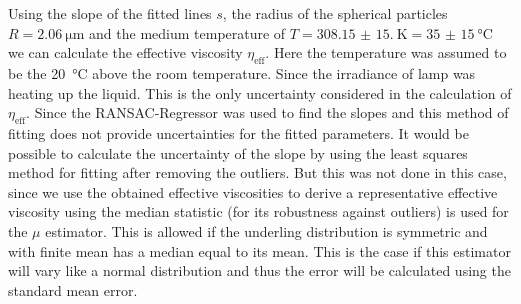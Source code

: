 \documentclass[12pt,english,ngerman]{scrartcl}
\begin{document}
Using the slope of the fitted lines $s$, the radius of the spherical particles
$R=\SI{2.06}{\micro\meter}$ and the medium temperature of
$T=\SI{308.15(15.00)}{\kelvin} = \SI{35(15)}{\celsius}$ we can calculate the
effective viscosity $\eta_\text{eff}$. Here the temperature was assumed to be
the \SI{20}{\celsius} above the room temperature. Since the irradiance of lamp
was heating up the liquid. This is the only uncertainty considered in the
calculation of $\eta_\text{eff}$. Since the RANSAC-Regressor was used to find
the slopes and this method of fitting does not provide uncertainties for the
fitted parameters. It would be possible to calculate the uncertainty of the
slope by using the least squares method for fitting after removing the
outliers. But this was not done in this case, since we use the obtained
effective viscosities to derive a representative effective viscosity using the
median statistic (for its robustness against outliers) is used for the $\mu$
estimator. This is allowed if the underling distribution is symmetric and with
finite mean has a median equal to its mean. This is the case if this estimator
will vary like a normal distribution and thus the error will be calculated
using the standard mean error.
\end{document}
